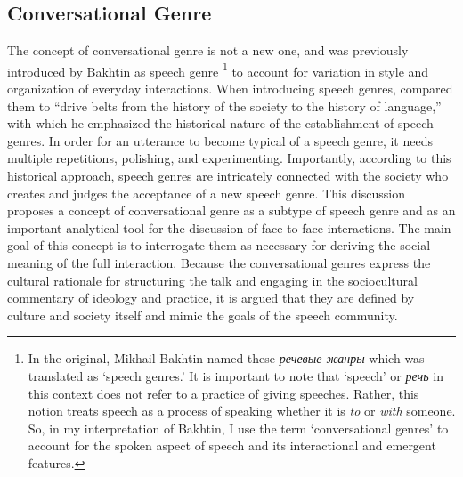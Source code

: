 \documentclass[12pt]{article}
\begin{document}
\subsection{Conversational Genre}
The concept of conversational genre is not a new one, and was previously introduced by Bakhtin as speech genre \footnote{In the original, Mikhail Bakhtin named these \foreignlanguage{russian}{\textit{речевые жанры}} which was translated as `speech genres.' It is important to note that `speech' or \foreignlanguage{russian}{\textit{речь}} in this context does not refer to a  practice of giving speeches. Rather, this notion treats speech as a process of speaking whether it is \textit{to} or \textit{with} someone. So, in my interpretation of Bakhtin, I use the term `conversational genres' to account for the spoken aspect of speech and its interactional and emergent features.} to account for variation in style and organization of everyday interactions. When introducing speech genres, \textcite[p. 65]{bakhtin1986} compared them to ``drive belts from the history of the society to the history of language,'' with which he emphasized the historical nature of the establishment of speech genres. In order for an utterance to become typical of a speech genre, it needs multiple repetitions, polishing, and experimenting. Importantly, according to this historical approach, speech genres are intricately connected with the society who creates and judges the acceptance of a new speech genre. This discussion proposes a concept of conversational genre as a subtype of speech genre and as an important analytical tool for the discussion of face-to-face interactions. The main goal of this concept is to interrogate them as necessary for deriving the social meaning of the full interaction. Because the conversational genres express the cultural rationale for structuring the talk and engaging in the sociocultural commentary of ideology and practice, it is argued that they are defined by culture and society itself and mimic the goals of the speech community. 
\end{document}

